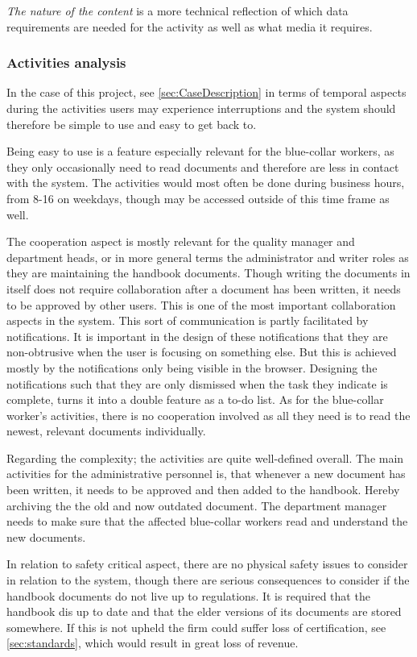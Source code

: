 \textit{The nature of the content} is a more technical reflection of which data requirements are needed for the activity as well as what media it requires.

\subsubsection*{Activities analysis}
In the case of this project, see \cref{sec:CaseDescription} in terms of temporal aspects during the activities users may experience interruptions and the system should therefore be simple to use and easy to get back to.

Being easy to use is a feature especially relevant for the blue-collar workers, as they only occasionally need to read documents and therefore are less in contact with the system.
The activities would most often be done during business hours, from 8-16 on weekdays, though may be accessed outside of this time frame as well.

The cooperation aspect is mostly relevant for the  quality manager and department heads, or in more general terms the administrator and writer roles as they are maintaining the handbook documents.
Though writing the documents in itself does not require collaboration after a document has been written, it needs to be approved by other users.
This is one of the most important collaboration aspects in the system.
This sort of communication is partly facilitated by notifications. It is important in the design of these notifications that they are non-obtrusive when the user is focusing on something else. But this is achieved mostly by the notifications only being visible in the browser. Designing the notifications such that they are only dismissed when the task they indicate is complete, turns it into a double feature as a to-do list.
As for the blue-collar worker's activities, there is no cooperation involved as all they need is to read the newest, relevant documents individually.

Regarding the complexity; the activities are quite well-defined overall.
The main activities for the administrative personnel is, that whenever a new document has been written, it needs to be approved and then added to the handbook.
Hereby archiving the the old and now outdated document.
The department manager needs to make sure that the affected blue-collar workers read and understand the new documents.

In relation to safety critical aspect, there are no physical safety issues to consider in relation to the system, though there are serious consequences to consider if the handbook documents do not live up to regulations.
It is required that the handbook dis up to date and that the elder versions of its documents are stored somewhere.
If this is not upheld the firm could suffer loss of certification, see \cref{sec:standards}, which would result in great loss of revenue.

